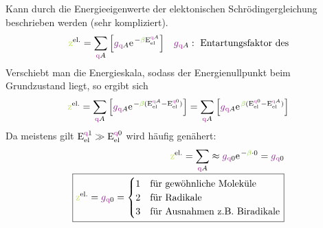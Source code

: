 \begin{sectionbox}\nospacing
    Kann durch die Energieeigenwerte der elektonischen Schrödingergleichung beschrieben werden (sehr kompliziert).
    \begin{align}
      \zzelek=\sum_{\Aqz}\left[\gfact_{\Aqz}\e^{-\betac\Ez_{\text{el}}^{\Aqz}}\right]&&\gfact_{\Aqz}:\text{ Entartungsfaktor des}
    \end{align}
    Verschiebt man die Energieskala, sodass der Energienullpunkt beim Grundzustand liegt, so ergibt sich
    \begin{align*}
          \zzelek=\sum_{\Aqz}\left[\gfact_{\Aqz}\e^{-\betac(\Ez_{\text{el}}^{\Aqz}-\Ez_{\text{el}}^{\qz{0}})}\right]=\sum_{\Aqz}\left[\gfact_{\Aqz}\e^{\betac(\Ez_{\text{el}}^{\qz{0}}-\Ez_{\text{el}}^{\Aqz})}\right]
    \end{align*}
    Da meistens gilt $\Ez_{\text{el}}^{\qz{1}}\gg\Ez_{\text{el}}^{\qz{0}}$ wird häufig genähert:
    \begin{align}
      \zzelek=\sum_{\Aqz}\approx\gfact_{\qz{0}}\e^{-\betac\cdot0}=\gfact_{\qz{0}}\nalign
      \boxed{\zzelek=\gfact_{\qz{0}}=
      \begin{cases}
        1 & \text{für gewöhnliche Moleküle}\\
        2 & \text{für Radikale}\\
        3 & \text{für Ausnahmen z.B. Biradikale}
      \end{cases}}
    \end{align}
\end{sectionbox}
